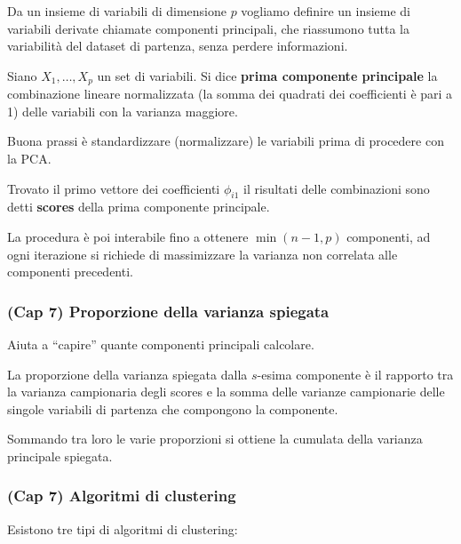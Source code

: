 \documentclass[
]{article}
\begin{document}
Da un insieme di variabili di dimensione \(p\) vogliamo definire un
insieme di variabili derivate chiamate componenti principali, che
riassumono tutta la variabilità del dataset di partenza, senza perdere
informazioni.

Siano \(X_1, \dots, X_p\) un set di variabili. Si dice \textbf{prima
componente principale} la combinazione lineare normalizzata (la somma
dei quadrati dei coefficienti è pari a 1) delle variabili con la
varianza maggiore.

Buona prassi è standardizzare (normalizzare) le variabili prima di
procedere con la PCA.

Trovato il primo vettore dei coefficienti \(\phi_{i1}\) il risultati
delle combinazioni sono detti \textbf{scores} della prima componente
principale.

La procedura è poi interabile fino a ottenere \(\min(n-1, p)\)
componenti, ad ogni iterazione si richiede di massimizzare la varianza
non correlata alle componenti precedenti.

\hypertarget{cap-7-proporzione-della-varianza-spiegata}{%
\subsubsection{(Cap 7) Proporzione della varianza
spiegata}\label{cap-7-proporzione-della-varianza-spiegata}}

Aiuta a ``capire'' quante componenti principali calcolare.

La proporzione della varianza spiegata dalla \(s\)-esima componente è il
rapporto tra la varianza campionaria degli scores e la somma delle
varianze campionarie delle singole variabili di partenza che compongono
la componente.

Sommando tra loro le varie proporzioni si ottiene la cumulata della
varianza principale spiegata.

\hypertarget{cap-7-algoritmi-di-clustering}{%
\subsubsection{(Cap 7) Algoritmi di
clustering}\label{cap-7-algoritmi-di-clustering}}

Esistono tre tipi di algoritmi di clustering:
\end{document}
